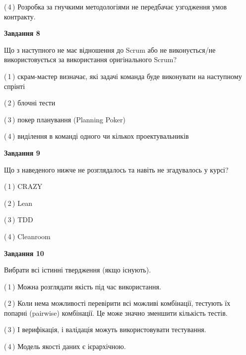 \documentclass[10pt, ukrainian]{article}
\begin{document}
{\begin {large}
(\,4\,) Розробка за гнучкими методологіями не передбачає узгодження умов контракту. %


{\begin {center}\textbf{Завдання 8}\end {center}}\par
Що з наступного не має відношення до Scrum або не виконується/не використовується за використання оригінального Scrum?\par
\vspace{2mm}



(\,1\,) скрам-мастер визначає, які задачі команда буде виконувати на наступному спрінті%



(\,2\,) блочні тести%



(\,3\,) покер планування (Planning Poker)%



(\,4\,) виділення в команді одного чи кількох проектувальників%


{\begin {center}\textbf{Завдання 9}\end {center}}\par
Що з наведеного нижче не розглядалось та навіть не згадувалось у курсі?\par
\vspace{2mm}



(\,1\,) CRAZY%



(\,2\,) Lean%



(\,3\,) TDD%



(\,4\,) Cleanroom%


{\begin {center}\textbf{Завдання 10}\end {center}}\par
Вибрати всі істинні твердження (якщо існують).\par
\vspace{2mm}



(\,1\,) Можна розглядати якість під час використання.%



(\,2\,) Коли нема можливості перевірити всі можливі комбінації, тестують їх попарні (pairwise) комбінації. Це може значно зменшити кількість тестів.%



(\,3\,) І верифікація, і валідація можуть використовувати тестування.%



(\,4\,) Модель якості даних є ієрархічною.%



\end {large}}
\end{document}
